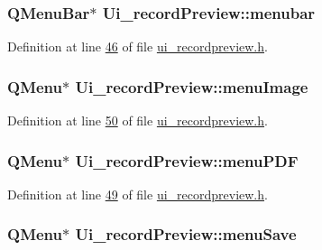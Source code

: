 \hypertarget{a00081_adddc4285028693f10dfd49cd08276e83}{
\subsubsection[{menubar}]{\setlength{\rightskip}{0pt plus 5cm}Q\+Menu\+Bar$\ast$ Ui\+\_\+record\+Preview\+::menubar}}\label{a00081_adddc4285028693f10dfd49cd08276e83}


Definition at line \hyperlink{a00140_source_l00046}{46} of file \hyperlink{a00140_source}{ui\+\_\+recordpreview.\+h}.

\hypertarget{a00081_af1ff1ecbe6ea007cfeda320cca9865b7}{
\subsubsection[{menu\+Image}]{\setlength{\rightskip}{0pt plus 5cm}Q\+Menu$\ast$ Ui\+\_\+record\+Preview\+::menu\+Image}}\label{a00081_af1ff1ecbe6ea007cfeda320cca9865b7}


Definition at line \hyperlink{a00140_source_l00050}{50} of file \hyperlink{a00140_source}{ui\+\_\+recordpreview.\+h}.

\hypertarget{a00081_a4cdb6b113583d4ef43a08b5526c13e3a}{
\subsubsection[{menu\+P\+D\+F}]{\setlength{\rightskip}{0pt plus 5cm}Q\+Menu$\ast$ Ui\+\_\+record\+Preview\+::menu\+P\+D\+F}}\label{a00081_a4cdb6b113583d4ef43a08b5526c13e3a}


Definition at line \hyperlink{a00140_source_l00049}{49} of file \hyperlink{a00140_source}{ui\+\_\+recordpreview.\+h}.

\hypertarget{a00081_a5ef77bf8c78c201d83049ee8b40cf345}{
\subsubsection[{menu\+Save}]{\setlength{\rightskip}{0pt plus 5cm}Q\+Menu$\ast$ Ui\+\_\+record\+Preview\+::menu\+Save}}\label{a00081_a5ef77bf8c78c201d83049ee8b40cf345}


